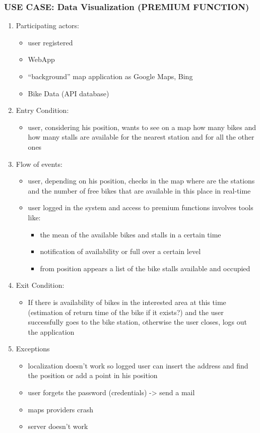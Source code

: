 \documentclass{article}
\begin{document}
\subsubsection{\textbf{USE CASE}: Data Visualization (PREMIUM FUNCTION)}
\begin{enumerate}
\item Participating actors: 
\begin{itemize}
    \item user registered
    \item WebApp
    \item “background” map application as Google Maps, Bing
        \item Bike Data (API database)
\end{itemize}
\item Entry Condition: 
\begin{itemize}
    \item user, considering his position, wants to see on a map how many bikes and how many stalls are available for the nearest station and for all the other ones
\end{itemize}
\item Flow of events: 
\begin{itemize}
    \item user, depending on his position, checks in the map where are the stations and the number of free bikes that are available in this place in real-time
    \item user logged in the system and access to premium functions involves tools like:
\begin{itemize}
        \item the mean of the available bikes and stalls in a certain time 
        \item notification of availability or full over a certain level
        \item from position appears a list of the bike stalls available and occupied
\end{itemize}
\end{itemize}
\item Exit Condition: 
\begin{itemize}
    \item If there is availability of bikes in the interested area at this time (estimation of return time of the bike if it exists?) and the user successfully goes to the bike station, otherwise the user closes, logs out the application
\end{itemize}
\item Exceptions
\begin{itemize}
    \item localization doesn’t work so logged user can insert the address and find the position or add a point in his position
    \item user forgets the password (credentials) -> send a mail
    \item maps providers crash
    \item server doesn’t work
\end{itemize}
\end{enumerate}
\end{document}
